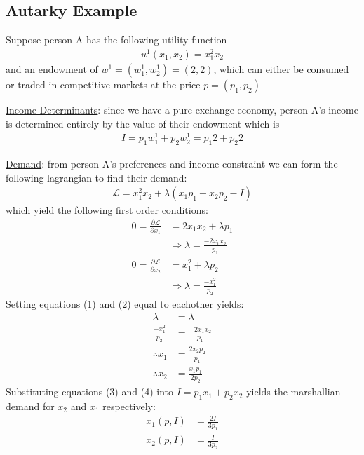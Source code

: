 \documentclass{article}
\begin{document}
\subsection{Autarky Example}
Suppose person A has the following utility function
\begin{gather*}
  u^{1}(x_{1},x_{2}) = x_{1}^{2}x_{2}
\end{gather*}
and an endowment of $w^{1} = (w^{1}_{1}, w^{1}_{2}) = (2,2)$, which can either be consumed or traded in competitive markets at the price $p = (p_{1}, p_{2})$
\par \vspace{0.3em}
  \underline{Income Determinants}: since we have a pure exchange economy, person A's income is determined entirely by the value of their endowment which is
  \begin{gather*}
    I = p_{1}w_{1}^{1} + p_{2}w_{2}^{1} = p_{1}2 + p_{2}2
  \end{gather*}
  \par
  \underline{Demand}: from person A's preferences and income constraint we can form the following lagrangian to find their demand:
  \begin{gather*}
    \mathcal{L} = x_{1}^{2}x_{2} + \lambda(x_{1}p_{1} + x_{2}p_{2} - I)
  \end{gather*}
  which yield the following first order conditions:
  \begin{align*}
    0 = \frac{\partial \mathcal{L}}{\partial x_{1}} &= 2x_{1}x_{2} + \lambda p_{1} \\
    &\Rightarrow \lambda = \frac{-2x_{1}x_{2}}{p_{1}} \ \tag{1} \\
    0 = \frac{\partial \mathcal{L}}{\partial x_{2}} &= x_{1}^{2} + \lambda p_{2} \\
    &\Rightarrow \lambda  = \frac{-x_{1}^{2}}{p_{2}} \ \tag{2}
  \end{align*}
  Setting equations (1) and (2) equal to eachother yields:
  \begin{align*}
    \lambda &= \lambda \\
    \frac{-x_{1}^{2}}{p_{2}} &= \frac{-2x_{1}x_{2}}{p_{1}} \\
    \therefore x_{1} &= \frac{2x_{2}p_{2}}{p_{1}} \ \tag{3} \\
    \therefore x_{2} &= \frac{x_{1}p_{1}}{2p_{2}} \ \tag{4}
  \end{align*}
  Substituting equations (3) and (4) into $I = p_{1}x_{1} + p_{2}x_{2}$ yields the marshallian demand for $x_{2}$ and $x_{1}$ respectively:
  \begin{align*}
    x_{1}(p,I) &= \frac{2I}{3p_{1}} \\
    x_{2}(p,I) &= \frac{I}{3p_{2}}
  \end{align*}
\end{document}
